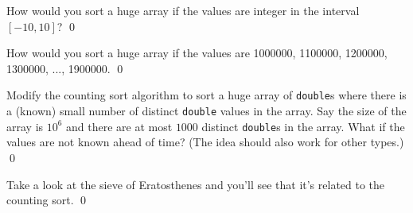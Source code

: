 \newpage

\begin{ex}
  How would you sort a huge array if the values are integer in the interval $[-10, 10]$?
  \qed
\end{ex}


\begin{ex}
  How would you sort a huge array if the values are
  1000000, 1100000, 1200000, 1300000, ..., 1900000.
  \qed
\end{ex}


\begin{ex}
  Modify the counting sort algorithm to sort a huge array of \verb!double!s
  where there is a (known) small number of distinct \verb!double! values in the 
  array.
  Say the size of the array is $10^6$ and there are at most $1000$ distinct
  \verb!double!s in the array.
  What if the values are not known ahead of time?
  (The idea should also work for other types.)
  \qed
\end{ex}


\begin{ex}
Take a look at the sieve of Eratosthenes and you'll see that it's related to 
the counting sort.
\qed
\end{ex}
